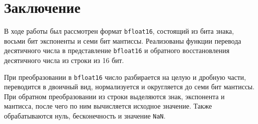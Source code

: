 \section{Заключение}

В ходе работы был рассмотрен формат \texttt{bfloat16}, состоящий из бита
знака, восьми бит экспоненты и семи бит мантиссы. Реализованы функции
перевода десятичного числа в представление \texttt{bfloat16} и обратного
восстановления десятичного числа из строки из 16 бит.

При преобразовании в \texttt{bfloat16} число разбирается на целую и дробную
части, переводится в двоичный вид, нормализуется и округляется до семи бит
мантиссы. При обратном преобразовании из строки выделяются знак, экспонента
и мантисса, после чего по ним вычисляется исходное значение. Также
обрабатываются нуль, бесконечность и значение \texttt{NaN}.

